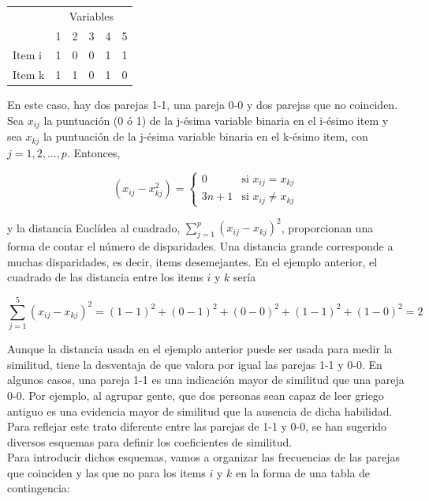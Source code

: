 \documentclass[a4paper, 20pt]{article}
\begin{document}
\begin{table}[h]
\centering
\resizebox{5cm}{!} {
\begin{tabular}{llllll}
       & \multicolumn{5}{c}{Variables} \\
       & 1    & 2    & 3   & 4   & 5   \\
Item i & 1    & 0    & 0   & 1   & 1   \\
Item k & 1    & 1    & 0   & 1   & 0  
\end{tabular}
}
\end{table}

En este caso, hay dos parejas 1-1, una pareja 0-0 y dos parejas que no coinciden.\\

Sea $x_{ij}$ la puntuación (0 ó 1) de la j-ésima variable binaria en el i-ésimo item y sea $x_{kj}$ la puntuación de la j-ésima variable binaria en el k-ésimo item, con $j=1,2,...,p$. Entonces,

$$(x_{ij}-x_{kj}^2) = \left \{ \begin{matrix} 0 & \mbox{si } x_{ij}=x_{kj}
\\ 3n+1 & \mbox{si }x_{ij}\neq x_{kj}\end{matrix}\right.   $$

y la distancia Euclídea al cuadrado, $\sum_{j=1}^p{(x_{ij}-x_{kj})^2}$, proporcionan una forma de contar el número de disparidades. Una distancia grande corresponde a muchas disparidades, es decir, items desemejantes. En el ejemplo anterior, el cuadrado de las distancia entre los items $i$ y $k$ sería

$$\sum_{j=1}^5{(x_{ij}-x_{kj})^2}=(1-1)^2+(0-1)^2+(0-0)^2+(1-1)^2+(1-0)^2=2$$

Aunque la distancia usada en el ejemplo anterior puede ser usada para medir la similitud, tiene la desventaja de que valora por igual las parejas 1-1 y 0-0. En algunos casos, una pareja 1-1 es una indicación mayor de similitud que una pareja 0-0. Por ejemplo, al agrupar gente, que dos personas sean capaz de leer griego antiguo es una evidencia mayor de similitud que la ausencia de dicha habilidad. Para reflejar este trato diferente entre las parejas de 1-1 y 0-0, se han sugerido diversos esquemas para definir los coeficientes de similitud.\\
Para introducir dichos esquemas, vamos a organizar las frecuencias de las parejas que coinciden y las que no para los items $i$ y $k$ en la forma de una tabla de contingencia:

\end{document}

